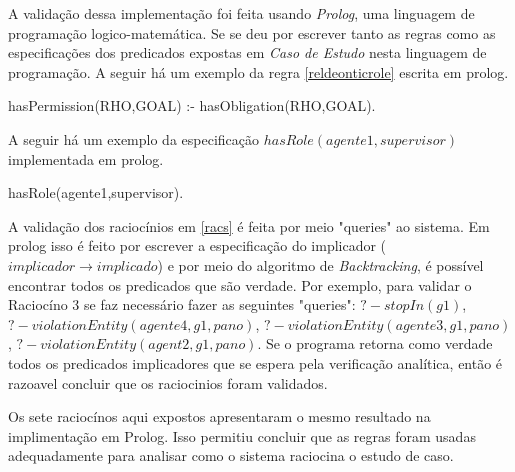 A validação dessa implementação foi feita usando \textit{Prolog}, uma linguagem de programação logico-matemática. Se se deu por escrever tanto as regras como 
as especificações dos predicados expostas em \textit{Caso de Estudo} nesta linguagem de programação. A seguir há um exemplo da regra \ref{reldeonticrole} escrita em prolog.

hasPermission(RHO,GOAL) :- hasObligation(RHO,GOAL).

A seguir há um exemplo da especificação $hasRole(agente1,supervisor)$ implementada em prolog.

hasRole(agente1,supervisor).

A validação dos raciocínios em \ref{racs} é feita por meio "queries" ao sistema. Em prolog isso é feito por escrever a especificação do implicador ($implicador \to implicado$) e por meio do algoritmo de \textit{Backtracking}, é 
possível encontrar todos os predicados que são verdade. Por exemplo, para validar o Raciocíno 3 se faz necessário fazer as seguintes "queries": $? - stopIn(g1)$, $? - violationEntity(agente4,g1,pano)$, $? - violationEntity(agente3,g1,pano)$, 
$? - violationEntity(agent2,g1,pano)$. Se o programa retorna como verdade todos os predicados implicadores que se espera pela verificação analítica, então é razoavel concluir que os raciocinios foram validados. 

Os sete raciocínos aqui expostos apresentaram o mesmo resultado na implimentação em Prolog. Isso permitiu concluir que as regras foram usadas adequadamente para analisar como o sistema raciocina o estudo de caso. 